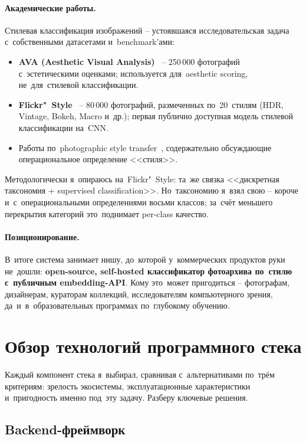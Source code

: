 \documentclass[a4paper,12pt]{diplom}
\begin{document}
\paragraph{Академические работы.} Стилевая классификация изображений -- устоявшаяся исследовательская задача с~собственными датасетами и~benchmark'ами:
\begin{itemize}
\item \textbf{AVA (Aesthetic Visual Analysis)}~\cite{Murray:2012} -- 250\,000 фотографий с~эстетическими оценками; используется для~aesthetic scoring, не~для~стилевой классификации.
\item \textbf{Flickr"~Style}~\cite{Karayev:2014} -- 80\,000 фотографий, размеченных по~20~стилям (HDR, Vintage, Bokeh, Macro и~др.); первая публично доступная модель стилевой классификации на~CNN.
\item Работы по~photographic style transfer~\cite{Luan:2017}, содержательно обсуждающие операциональное определение <<стиля>>.
\end{itemize}

Методологически я~опираюсь на~Flickr"~Style: та~же связка <<дискретная таксономия + supervised classification>>. Но~таксономию я~взял свою -- короче и~с~операциональными определениями восьми классов; за~счёт меньшего перекрытия категорий это~поднимает per-class качество.

\paragraph{Позиционирование.} В~итоге система занимает нишу, до~которой у~коммерческих продуктов руки не~дошли: \textbf{open-source, self-hosted классификатор фотоархива по~стилю с~публичным embedding-API}. Кому это~может пригодиться -- фотографам, дизайнерам, кураторам коллекций, исследователям компьютерного зрения, да~и~в~образовательных программах по~глубокому обучению.

\section{Обзор технологий программного стека}
\label{sec:stack}

Каждый компонент стека я~выбирал, сравнивая с~альтернативами по~трём критериям: зрелость экосистемы, эксплуатационные характеристики и~пригодность именно под~эту задачу. Разберу ключевые решения.

\subsection{Backend-фреймворк}
\end{document}
